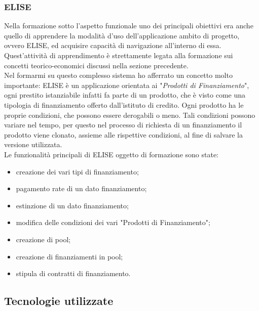 \subsubsection{ELISE}

Nella formazione sotto l'aspetto funzionale uno dei principali obiettivi era anche quello di apprendere la modalità d'uso dell'applicazione ambito di progetto, ovvero ELISE, ed acquisire capacità di navigazione all'interno di essa. Quest'attività di apprendimento è strettamente legata alla formazione sui concetti teorico-economici discussi nella sezione precedente.\\

Nel formarmi su questo complesso sistema ho afferrato un concetto molto importante: ELISE è un applicazione orientata ai "\textit{Prodotti di Finanziamento}", ogni prestito istanziabile infatti fa parte di un prodotto, che è visto come una tipologia di finanziamento offerto dall'istituto di credito. Ogni prodotto ha le proprie condizioni, che possono essere derogabili o meno. Tali condizioni possono variare nel tempo, per questo nel processo di richiesta di un finanziamento il prodotto viene clonato, assieme alle rispettive condizioni, al fine di salvare la versione utilizzata.\\

Le funzionalità principali di ELISE oggetto di formazione sono state:
	\begin{itemize}
	\item creazione dei vari tipi di finanziamento;
	\item pagamento rate di un dato finanziamento;
	\item estinzione di un dato finanziamento;
	\item modifica delle condizioni dei vari "Prodotti di Finanziamento";
	\item creazione di pool;
	\item creazione di finanziamenti in pool;
	\item stipula di contratti di finanziamento.
	\end{itemize}

\subsection{Tecnologie utilizzate}

